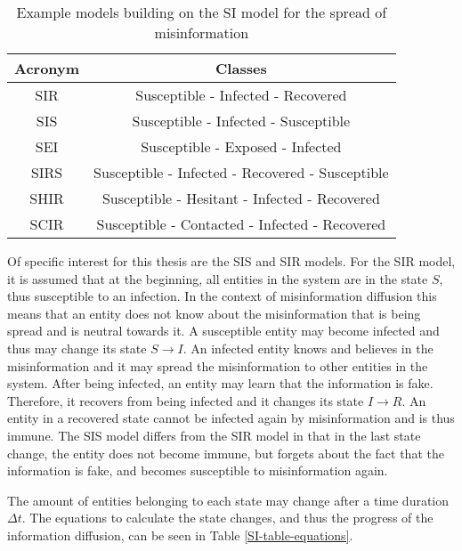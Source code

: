 \begin{table}[ht!]
    \centering
    \begin{tabular}{|c | c |} 
     \hline
     Acronym & Classes  \\ 
     \hline
     SIR & Susceptible - Infected - Recovered  \\ 
     \hline
     SIS & Susceptible - Infected - Susceptible \\
     \hline
     SEI & Susceptible - Exposed - Infected \\
     \hline
     SIRS & Susceptible - Infected - Recovered - Susceptible \\
     \hline
     SHIR & Susceptible - Hesitant - Infected - Recovered \\
     \hline
     SCIR & Susceptible - Contacted - Infected - Recovered \\
     \hline
    \end{tabular}
    \caption{Example models building on the SI 
    model for the spread of misinformation \cite{reviewinformationdiffusion}}
    \label{SI-table}
\end{table}

Of specific interest for this thesis are the SIS and SIR models. 
For the SIR model, it is assumed that at the beginning, all entities in the 
system are in the state $S$, thus susceptible to an infection. In the context of 
misinformation diffusion this means that an entity does not know about the
misinformation that is being spread and is neutral towards it. A susceptible
entity may become infected and thus may change its state $S\to I$.
An infected entity knows and believes in the misinformation and it may
spread the misinformation to other entities in the system. After being infected,
an entity may learn that the information is fake. Therefore, it recovers 
from being infected and it changes its state $I\to R$. An entity in a 
recovered state cannot be infected again by misinformation and is thus immune.
The SIS model differs from the SIR model in that in the last state change,
the entity does not become immune, but \glqq forgets\grqq{} about the fact
that the information is fake, and becomes susceptible to misinformation again.

The amount of entities belonging to each state may change 
after a time duration $\Delta t$. The equations to calculate the 
state changes, and thus the progress of the information diffusion, 
can be seen in Table \ref{SI-table-equations}.

